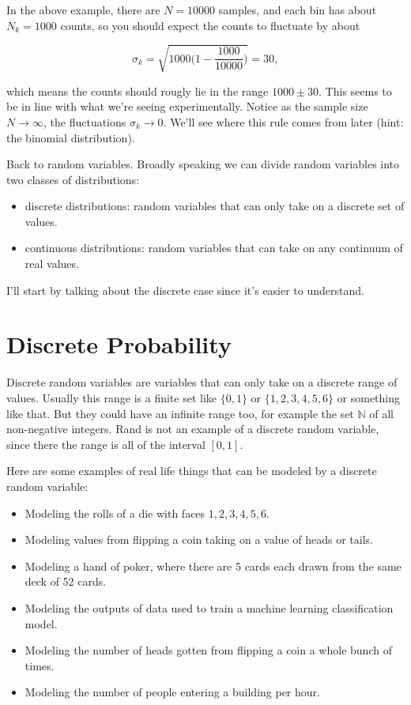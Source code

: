 \documentclass[
  letterpaper,
  DIV=11,
  numbers=noendperiod]{scrreprt}
\providecommand{\tightlist}{%
  \setlength{\itemsep}{0pt}\setlength{\parskip}{0pt}}\usepackage{longtable,booktabs,array}
\begin{document}
In the above example, there are \(N=10000\) samples, and each bin has
about \(N_k=1000\) counts, so you should expect the counts to fluctuate
by about

\[\sigma_k = \sqrt{1000\bigg(1 - \frac{1000}{10000}\bigg)} = 30,\]

which means the counts should rougly lie in the range \(1000 \pm 30\).
This seems to be in line with what we're seeing experimentally. Notice
as the sample size \(N \rightarrow \infty\), the fluctuations
\(\sigma_k \rightarrow 0\). We'll see where this rule comes from later
(hint: the binomial distribution).

Back to random variables. Broadly speaking we can divide random
variables into two classes of distributions:

\begin{itemize}
\tightlist
\item
  discrete distributions: random variables that can only take on a
  discrete set of values.
\item
  continuous distributions: random variables that can take on any
  continuum of real values.
\end{itemize}

I'll start by talking about the discrete case since it's easier to
understand.

\hypertarget{discrete-probability}{%
\section{Discrete Probability}\label{discrete-probability}}

Discrete random variables are variables that can only take on a discrete
range of values. Usually this range is a finite set like \(\{0,1\}\) or
\(\{1,2,3,4,5,6\}\) or something like that. But they could have an
infinite range too, for example the set \(\mathbb{N}\) of all
non-negative integers. Rand is not an example of a discrete random
variable, since there the range is all of the interval \([0,1]\).

Here are some examples of real life things that can be modeled by a
discrete random variable:

\begin{itemize}
\tightlist
\item
  Modeling the rolls of a die with faces \(1,2,3,4,5,6\).
\item
  Modeling values from flipping a coin taking on a value of heads or
  tails.
\item
  Modeling a hand of poker, where there are 5 cards each drawn from the
  same deck of 52 cards.
\item
  Modeling the outputs of data used to train a machine learning
  classification model.
\item
  Modeling the number of heads gotten from flipping a coin a whole bunch
  of times.
\item
  Modeling the number of people entering a building per hour.
\end{itemize}
\end{document}
